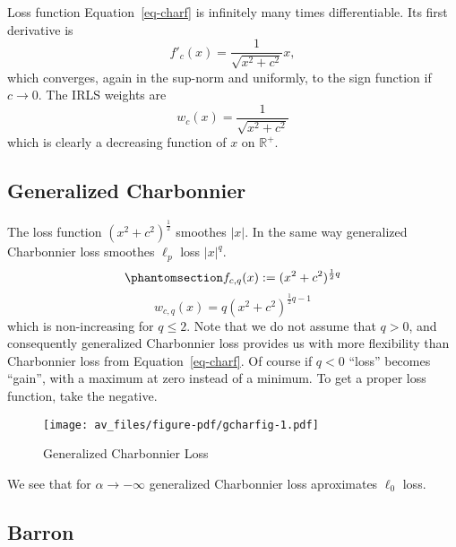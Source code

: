 \documentclass[
  12pt,
  letterpaper,
  DIV=11,
  numbers=noendperiod]{scrartcl}
\theoremstyle{plain}
\theoremstyle{plain}
\theoremstyle{plain}
\theoremstyle{definition}
\theoremstyle{remark}
\begin{document}
Loss function Equation~\ref{eq-charf} is infinitely many times
differentiable. Its first derivative is \begin{equation}
f'_c(x)=\frac{1}{\sqrt{x^2+c^2}}x,\label{eq:charg}
\end{equation} which converges, again in the sup-norm and uniformly, to
the sign function if \(c\rightarrow 0\). The IRLS weights are
\begin{equation}
w_c(x)=\frac{1}{\sqrt{x^2+c^2}}\label{eq:charw}
\end{equation} which is clearly a decreasing function of \(x\) on
\(\mathbb{R}^+\).

\subsection{Generalized Charbonnier}\label{generalized-charbonnier}

The loss function \((x^2+c^2)^\frac12\) smoothes \(|x|\). In the same
way generalized Charbonnier loss smoothes \(\ell_p\) loss \(|x|^q\).
\begin{equation}\phantomsection\label{eq-gcharf}{
f_{c,q}(x):=(x^2+c^2)^{\frac12 q}
}\end{equation} \begin{equation}
w_{c,q}(x)=q(x^2+c^2)^{\frac12 q-1}\label{eq:gcharw}
\end{equation} which is non-increasing for \(q\leq 2\). Note that we do
not assume that \(q>0\), and consequently generalized Charbonnier loss
provides us with more flexibility than Charbonnier loss from
Equation~\ref{eq-charf}. Of course if \(q<0\) ``loss'' becomes ``gain'',
with a maximum at zero instead of a minimum. To get a proper loss
function, take the negative.

\begin{figure}[H]

{\centering \texttt{[image: av\_files/figure-pdf/gcharfig-1.pdf]}

}

\caption{Generalized Charbonnier Loss}

\end{figure}%

We see that for \(\alpha\rightarrow-\infty\) generalized Charbonnier
loss aproximates \(\ell_0\) loss.

\subsection{Barron}\label{barron}
\end{document}
